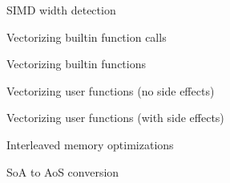 
\begin{frame}{SIMD width detection}

\end{frame}


\begin{frame}{Vectorizing builtin function calls}


\end{frame}


\begin{frame}{Vectorizing builtin functions}


\end{frame}


\begin{frame}{Vectorizing user functions (no side effects)}


\end{frame}


\begin{frame}{Vectorizing user functions (with side effects)}


\end{frame}


\begin{frame}{Interleaved memory optimizations}

\end{frame}


\begin{frame}{SoA to AoS conversion}

\end{frame}


